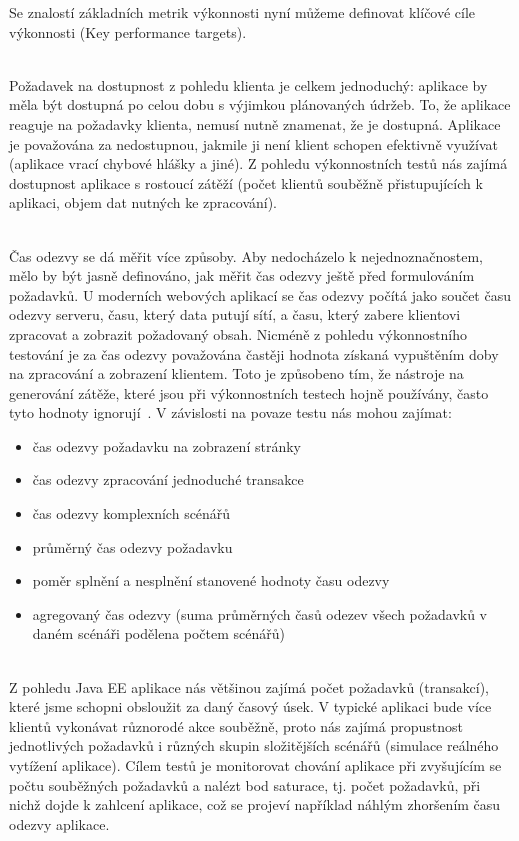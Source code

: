 \documentclass[122pt,oneside]{fithesis}
\begin{document}
Se znalostí základních metrik výkonnosti nyní můžeme definovat klíčové cíle výkonnosti (Key performance targets).

\vspace{5 mm}
\\\indent Požadavek na dostupnost z pohledu klienta je celkem jednoduchý: aplikace by měla být dostupná po celou dobu s výjimkou plánovaných údržeb. To, že aplikace reaguje na požadavky klienta, nemusí nutně znamenat, že je dostupná. Aplikace je považována za nedostupnou, jakmile ji není klient schopen efektivně využívat (aplikace vrací chybové hlášky a jiné).
Z pohledu výkonnostních testů nás zajímá dostupnost aplikace s rostoucí zátěží (počet klientů souběžně přistupujících k aplikaci, objem dat nutných ke zpracování). 

\vspace{5 mm}
\\\indent Čas odezvy se dá měřit více způsoby. Aby nedocházelo k nejednoznačnostem, mělo by být jasně definováno, jak měřit čas odezvy ještě před formulováním požadavků. U moderních webových aplikací se čas odezvy počítá jako součet času odezvy serveru, času, který data putují sítí, a času, který zabere klientovi zpracovat a zobrazit požadovaný obsah. Nicméně z pohledu výkonnostního testování je za čas odezvy považována častěji hodnota získaná vypuštěním doby na zpracování a zobrazení klientem. Toto je způsobeno tím, že nástroje na generování zátěže, které jsou při výkonnostních testech hojně používány, často tyto hodnoty ignorují~\cite{moorthy09}.
V závislosti na povaze testu nás mohou zajímat:
\begin{itemize}
  \item čas odezvy požadavku na zobrazení stránky
  \item čas odezvy zpracování jednoduché transakce
  \item čas odezvy komplexních scénářů
  \item průměrný čas odezvy požadavku
  \item poměr splnění a nesplnění stanovené hodnoty času odezvy
  \item agregovaný čas odezvy (suma průměrných časů odezev všech požadavků v daném scénáři podělena počtem scénářů)
\end{itemize}


\vspace{5 mm}
\\\indent Z pohledu Java EE aplikace nás většinou zajímá počet požadavků (transakcí), které jsme schopni obsloužit za daný časový úsek. V typické aplikaci bude více klientů vykonávat různorodé akce souběžně, proto nás zajímá propustnost jednotlivých požadavků i různých skupin složitějších scénářů (simulace reálného vytížení aplikace). Cílem testů je monitorovat chování aplikace při zvyšujícím se počtu souběžných požadavků a nalézt bod saturace, tj. počet požadavků, při nichž dojde k zahlcení aplikace, což se projeví například náhlým zhoršením času odezvy aplikace. 
\end{document}
